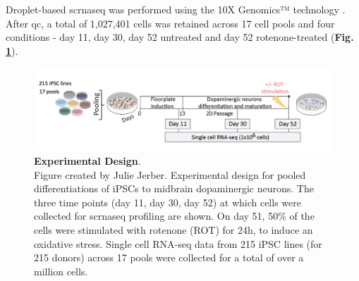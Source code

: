 Droplet-based \gls{scrnaseq} was performed using the 10X Genomics™ technology \cite{zheng2017massively}.
After \gls{qc}, 
a total of 1,027,401 cells
was retained
across 17 cell pools and four conditions - day 11, day 30, day 52 untreated and day 52 rotenone-treated (\textbf{Fig. \ref{fig:neuroseq_experimental_design}}).

\begin{figure}[h]
\includegraphics[width=16cm]{Chapter5/Fig/neuroseq_experimental_design.png}
\caption[Experimental Design]{\textbf{Experimental Design}.\\
Figure created by Julie Jerber.
Experimental design for pooled differentiations of iPSCs to midbrain dopaminergic neurons. 
The three time points (day 11, day 30, day 52) at which cells were collected for \gls{scrnaseq} profiling are shown. 
On day 51, 50\% of the cells were stimulated with rotenone (ROT) for 24h, to induce an oxidative stress.
Single cell RNA-seq data from 215 iPSC lines (for 215 donors) across 17 pools were collected for a total of over a million cells.}
\label{fig:neuroseq_experimental_design}
\end{figure}



